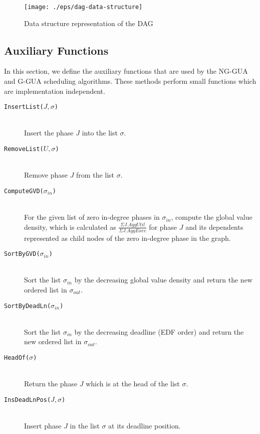 \documentclass[12pt,dvips]{report}
\begin{document}
\begin{figure} [htbp]
  \centering
  \texttt{[image: ./eps/dag-data-structure]}  
  \caption{Data structure representation of the DAG}
  \label{fig:dagdatast}
\end{figure}


\subsection{Auxiliary Functions}\label{sec:aux-funcs}

In this section, we define the auxiliary functions that are used by the NG-GUA and G-GUA scheduling algorithms. These methods perform small functions which are implementation independent.

\begin{description}
	\item[\texttt{InsertList($J, \sigma$)}] \hfill \\
		Insert the phase $J$ into the list $\sigma$. 

	\item[\texttt{RemoveList($U, \sigma$)}] \hfill \\
		Remove phase $J$ from the list $\sigma$.
	
	\item[\texttt{ComputeGVD($\sigma_{in}$)}] \hfill \\	
		For the given list of zero in-degree phases in $\sigma_{in}$,
		compute the global value density, which is calculated as $\frac{\Sigma J.AggUtil}{\Sigma J.AggExec}$
		for phase $J$ and its dependents represented as child nodes of the zero in-degree phase in the graph.
		
	\item[ \texttt{SortByGVD($\sigma_{in}$)}] \hfill \\
		Sort the list $\sigma_{in}$ by the decreasing
 		global value density and return the new ordered list in $\sigma_{out}$.
 		
 	\item[\texttt{SortByDeadLn($\sigma_{in}$)}] \hfill \\
		Sort the list $\sigma_{in}$ by the decreasing
 		deadline (EDF order) and return the new ordered list in $\sigma_{out}$.

	\item[\texttt{HeadOf($\sigma$)}] \hfill \\
		Return the phase $J$ which is at the head of the list $\sigma$.
		
	\item[\texttt{InsDeadLnPos($J, \sigma$)}] \hfill \\
		Insert phase $J$ in the list $\sigma$ at its deadline position.


\end{description}
\end{document}
